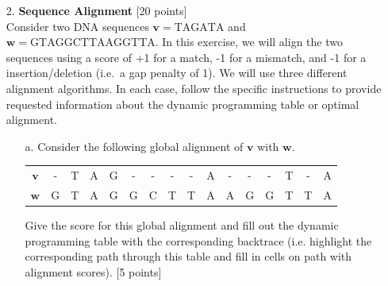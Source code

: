 \begin{enumerate}
\begin{enumerate}
\end{enumerate}

\clearpage

\item[2.] \textbf{Sequence Alignment} [20 points]
\\
 
Consider two DNA sequences $\mathbf{v} = \mathrm{TAGATA}$ and $\mathbf{w} = \mathrm{GTAGGCTTAAGGTTA}$. 
In this exercise, we will align the two sequences using a score of +1 for a match, -1 for a mismatch, and -1 for a insertion/deletion (i.e.\ a gap penalty of 1).
We will use three different alignment algorithms. In each case, follow the specific instructions to provide requested information about the dynamic programming table or optimal alignment.  



\begin{enumerate}
\item[a.] Consider the following global alignment of $\mathbf{v}$ with $\mathbf{w}$. 
\begin{center}
\begin{tabular}{ c | c c c c c c c c c c c c c c c } 
$\mathbf{v}$ & - & T & A & G	&-&	-&	- &	- &	A & -	&-&	- &	T &	- &	A  \\
$\mathbf{w}$ & G & T & A & G & G & C & T & T & A & A &	G &	G &	T &	T &	A\\
\end{tabular}
\end{center}

Give the score for this global alignment and fill out the dynamic programming table with the corresponding backtrace (i.e. highlight the corresponding path through this table and fill in cells on path with alignment scores).  [5 points]

\vspace{.5cm}


\end{enumerate}
\end{enumerate}
